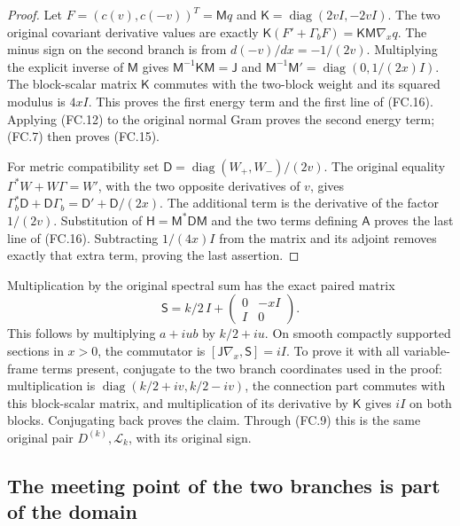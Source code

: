 \begin{proof}
Let \(F=(c(v),c(-v))^T=\mathsf Mq\) and
\(\mathsf K=\operatorname{diag}(2vI,-2vI)\). The two original
covariant derivative values are exactly
\(\mathsf K(F'+\Gamma_bF)=\mathsf K\mathsf M\nabla_xq\).
The minus sign on the second branch is from \(d(-v)/dx=-1/(2v)\).
Multiplying the explicit inverse of \(\mathsf M\) gives
\(\mathsf M^{-1}\mathsf K\mathsf M=\mathsf J\) and
\(\mathsf M^{-1}\mathsf M'=\operatorname{diag}(0,1/(2x)I)\).
The block-scalar matrix \(\mathsf K\) commutes with the two-block
weight and its squared modulus is \(4xI\). This proves the first
energy term and the first line of (FC.16). Applying (FC.12) to
the original normal Gram proves the second energy term; (FC.7)
then proves (FC.15).

For metric compatibility set
\(\mathsf D=\operatorname{diag}(W_+,W_-)/(2v)\).
The original equality \(\Gamma^*W+W\Gamma=W'\), with the
two opposite derivatives of \(v\), gives
\(\Gamma_b^*\mathsf D+\mathsf D\Gamma_b
 =\mathsf D'+\mathsf D/(2x)\). The additional term is the
derivative of the factor \(1/(2v)\). Substitution of
\(\mathsf H=\mathsf M^*\mathsf D\mathsf M\) and the two
terms defining \(\mathsf A\) proves the last line of (FC.16).
Subtracting \(1/(4x)I\) from the matrix and its adjoint removes
exactly that extra term, proving the last assertion.
\end{proof}

Multiplication by the original spectral sum has the exact paired matrix
\[
 \mathsf S=k/2\,I+
                \begin{pmatrix}0&-xI\\I&0\end{pmatrix}.
 \tag{FC.17}
\]
This follows by multiplying \(a+iu b\) by \(k/2+iu\).
On smooth compactly supported sections in \(x>0\), the commutator
is \([\mathsf J\nabla_x,\mathsf S]=iI\). To prove it with
all variable-frame terms present, conjugate to the two branch
coordinates used in the proof: multiplication is
\(\operatorname{diag}(k/2+iv,k/2-iv)\), the connection part
commutes with this block-scalar matrix, and multiplication of its
derivative by \(\mathsf K\) gives \(iI\) on both blocks.
Conjugating back proves the claim. Through (FC.9) this is the
same original pair \(D^{(k)},\mathscr L_k\), with its original sign.

\subsection{The meeting point of the two branches is part of the domain}

